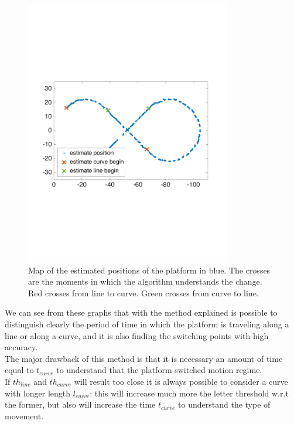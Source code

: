 \begin{figure}[!htbp]
    \centering
    \includegraphics[width=0.8\textwidth]{img/following_platform_for_long_map_simple.pdf}
    \caption{Map of the estimated positions of the platform in blue. The crosses are the moments in which the algorithm understands the change. Red crosses from line to curve. Green crosses from curve to line.}
    \label{fig:error_regression_map}
\end{figure}

We can see from these graphs that with the method explained is possible to distinguish clearly the period of time in which the platform is traveling along a line or along a curve, and it is also finding the switching points with high accuracy.\\ 
The major drawback of this method is that it is necessary an amount of time equal to $t_{curve}$ to understand that the platform switched motion regime. \\
If  $th_{line}$ and  $th_{curve}$ will result too close it is always possible to consider a curve with longer length $l_{curve}$: this will increase much more the letter threshold w.r.t the former, but also will increase the time $t_{curve}$ to understand the type of movement.

